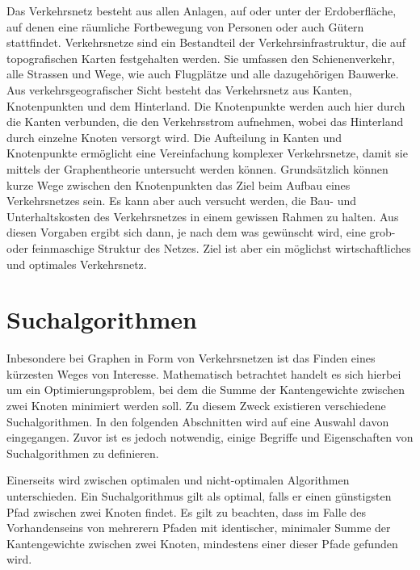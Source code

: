 \label{section:verkehr/einfuehrung}
\noindent
Das Verkehrsnetz besteht aus allen Anlagen, auf oder unter der Erdoberfläche, auf denen eine räumliche Fortbewegung von Personen oder auch Gütern stattfindet. Verkehrsnetze sind ein Bestandteil der Verkehrsinfrastruktur, die auf topografischen Karten festgehalten werden. Sie umfassen den Schienenverkehr, alle Strassen und Wege, wie auch Flugplätze und alle dazugehörigen Bauwerke.
%
%
%
%
Aus verkehrsgeografischer Sicht besteht das Verkehrsnetz aus Kanten, Knotenpunkten und dem Hinterland. Die Knotenpunkte werden auch hier durch die Kanten verbunden, die den Verkehrsstrom aufnehmen, wobei das Hinterland durch einzelne Knoten versorgt wird. Die Aufteilung in Kanten und Knotenpunkte ermöglicht eine Vereinfachung komplexer Verkehrsnetze, damit sie mittels der Graphentheorie untersucht werden können.
%
%
%
Grundsätzlich können kurze Wege zwischen den Knotenpunkten das Ziel beim Aufbau eines Verkehrsnetzes sein. Es kann aber auch versucht werden, die Bau- und Unterhaltskosten des Verkehrsnetzes in einem gewissen Rahmen zu halten. Aus diesen Vorgaben ergibt sich dann, je nach dem was gewünscht wird, eine grob- oder feinmaschige Struktur des Netzes.
%
Ziel ist aber ein möglichst wirtschaftliches und optimales Verkehrsnetz.

\section{Suchalgorithmen}
Inbesondere bei Graphen in Form von Verkehrsnetzen ist das Finden eines kürzesten Weges von Interesse. Mathematisch betrachtet handelt es sich hierbei um ein Optimierungsproblem, bei dem die Summe der Kantengewichte zwischen zwei Knoten minimiert werden soll. Zu diesem Zweck existieren verschiedene Suchalgorithmen. In den folgenden Abschnitten wird auf eine Auswahl davon eingegangen. Zuvor ist es jedoch notwendig, einige Begriffe und Eigenschaften von Suchalgorithmen zu definieren.
%
%
%

Einerseits wird zwischen optimalen und nicht-optimalen Algorithmen unterschieden. Ein Suchalgorithmus gilt als optimal, falls er einen günstigsten Pfad zwischen zwei Knoten findet. Es gilt zu beachten, dass im Falle des Vorhandenseins von mehrerern Pfaden mit identischer, minimaler Summe der Kantengewichte zwischen zwei Knoten, mindestens einer dieser Pfade gefunden wird.
%
%

